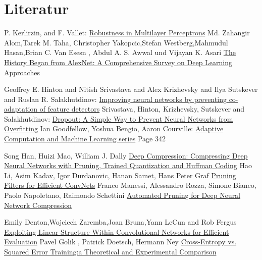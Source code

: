 \documentclass[12pt,a4paper]{scrartcl}
\numberwithin{equation}{section}
\begin{document}
\section{Literatur}
\begin{thebibliography}{lem00}
	P. Kerlirzin, and F. Vallet: \href{ https://www.mitpressjournals.org/doi/abs/10.1162/neco.1993.5.3.473?journalCode=neco} {Robustness in Multilayer Perceptrons}
		Md. Zahangir Alom,Tarek M. Taha, Christopher Yakopcic,Stefan Westberg,Mahmudul Hasan,Brian C. Van Esesn , Abdul A. S. Awwal und Vijayan K. Asari \href{https://arxiv.org/abs/1803.01164}{The History Began from AlexNet: A Comprehensive Survey on Deep Learning Approaches}
	
 	Geoffrey E. Hinton and Nitish Srivastava and Alex Krizhevsky and Ilya Sutskever and Ruslan R. Salakhutdinov: \href{https://arxiv.org/abs/1207.0580}{Improving neural networks by preventing co-adaptation of feature detectors}
 	Srivastava, Hinton, Krizhevsky, Sutskever and Salakhutdinov: \href{http://jmlr.org/papers/volume15/srivastava14a.old/srivastava14a.pdf}{Dropout: A Simple Way to Prevent Neural Networks from Overfitting}
Ian Goodfellow, Yoshua Bengio, Aaron Courville:
\href{https://www.amazon.com/Deep-Learning-Adaptive-Computation-Machine/dp/0262035618/ref=as_li_ss_tl?ieTF8&qid=1548018253&sr=8-3&keywords=deep+learning&linkCode=sl1&tag=inspiredalgor-20&linkId=49b3b1cce7e04bb3c9b99f2d878bf805&language=en_US}{Adaptive Computation and Machine Learning series} Page 342
 
	 Song Han, Huizi Mao, William J. Dally \href{https://arxiv.org/abs/1510.00149}{Deep Compression: Compressing Deep Neural Networks with Pruning, Trained Quantization and Huffman Coding}
 	Hao Li, Asim Kadav, Igor Durdanovic, Hanan Samet, Hans Peter Graf
 	\href{https://arxiv.org/abs/1608.08710}{Pruning Filters for Efficient ConvNets}
      Franco Manessi, Alessandro Rozza, Simone Bianco, Paolo Napoletano, Raimondo Schettini \href{https://arxiv.org/abs/1712.01721}{Automated Pruning for Deep Neural Network Compression}
      
   		Emily Denton,Wojciech Zaremba,Joan Bruna,Yann LeCun and	Rob Fergus
   		\href{https://arxiv.org/pdf/1404.0736.pdf}{Exploiting Linear Structure Within Convolutional
   			Networks for Efficient Evaluation}
 	 Pavel Golik , Patrick Doetsch, Hermann Ney
 	\href{http://books.jackon.me/Cross-Entropy-vs-Squared-Error-Training-a-Theoretical-and-Experimental-Comparison.pdf}{Cross-Entropy vs. Squared Error Training:a Theoretical and Experimental Comparison}
 	

\end{thebibliography}
\end{document}
